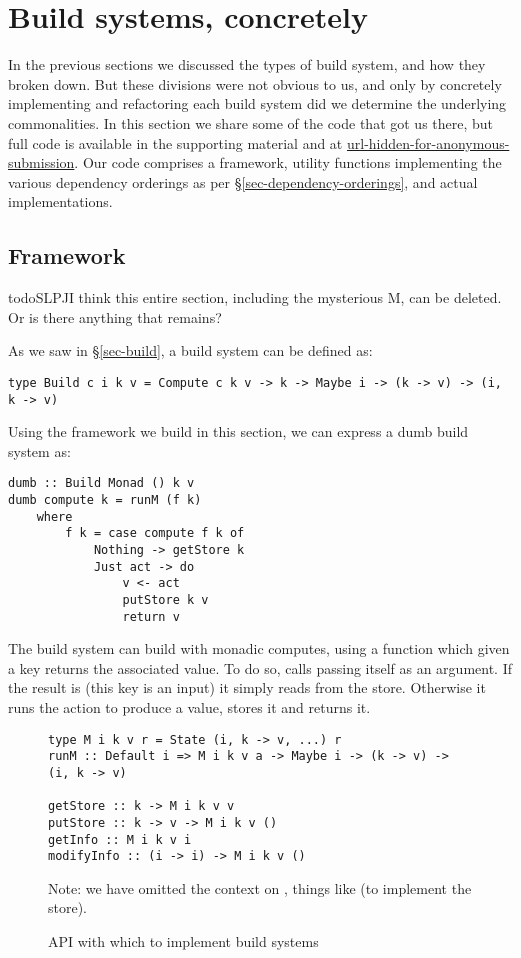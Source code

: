 \clearpage
\section{Build systems, concretely}\label{sec-implementations}

In the previous sections we discussed the types of build system, and how they broken down. But these divisions were not obvious to us, and only by concretely implementing and refactoring each build system did we determine the underlying commonalities. In this section we share some of the code that got us there, but full code is available in the supporting material and at \url{url-hidden-for-anonymous-submission}. Our code comprises a framework, utility functions implementing the various dependency orderings as per \S\ref{sec-dependency-orderings}, and actual implementations.

\subsection{Framework}

todo{SLPJ}{I think this entire section, including the mysterious M, can be deleted.  Or is
there anything that remains?}

As we saw in \S\ref{sec-build}, a build system can be defined as:

\begin{verbatim}
type Build c i k v = Compute c k v -> k -> Maybe i -> (k -> v) -> (i, k -> v)
\end{verbatim}

Using the framework we build in this section, we can express a dumb build system as:

\begin{verbatim}
dumb :: Build Monad () k v
dumb compute k = runM (f k)
    where
        f k = case compute f k of
            Nothing -> getStore k
            Just act -> do
                v <- act
                putStore k v
                return v
\end{verbatim}

The  build system can build with monadic computes, using a function  which given a key returns the associated value. To do so,  calls  passing  itself as an argument. If the result is  (this key is an input) it simply reads from the store. Otherwise it runs the action to produce a value, stores it and returns it.

\begin{figure}
\begin{verbatim}
type M i k v r = State (i, k -> v, ...) r
runM :: Default i => M i k v a -> Maybe i -> (k -> v) -> (i, k -> v)

getStore :: k -> M i k v v
putStore :: k -> v -> M i k v ()
getInfo :: M i k v i
modifyInfo :: (i -> i) -> M i k v ()
\end{verbatim}
Note: we have omitted the context on , things like  (to implement the store).
\caption{API with which to implement build systems}
\label{fig-M-api}
\end{figure}

